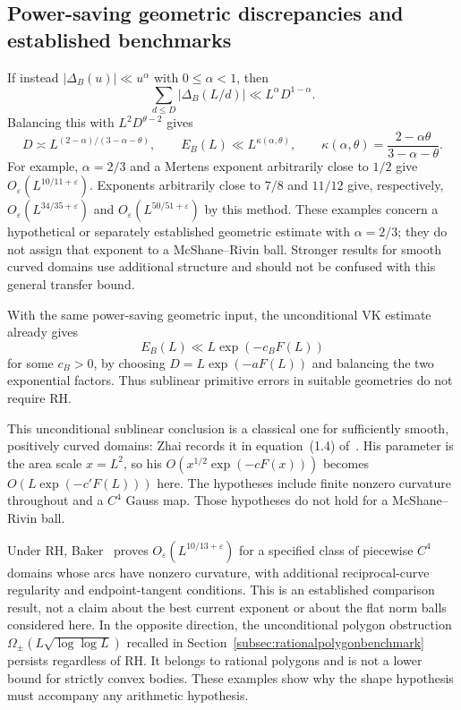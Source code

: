 \documentclass[11pt,a4paper]{article}
\numberwithin{equation}{section}
\theoremstyle{definition}
\theoremstyle{remark}
\begin{document}
\subsection{Power-saving geometric discrepancies and established benchmarks}
If instead $|\Delta_B(u)|\ll u^\alpha$ with $0\le\alpha<1$, then
\[
 \sum_{d\le D}|\Delta_B(L/d)|\ll L^\alpha D^{1-\alpha}.
\]
Balancing this with $L^2D^{\theta-2}$ gives
\begin{equation}\label{eq:primitiveRHbalancedpower}
 D\asymp L^{(2-\alpha)/(3-\alpha-\theta)},\qquad
 E_B(L)\ll L^{\kappa(\alpha,\theta)},\qquad
 \kappa(\alpha,\theta)=\frac{2-\alpha\theta}{3-\alpha-\theta}.
\end{equation}
For example, $\alpha=2/3$ and a Mertens exponent arbitrarily close
to $1/2$ give $O_\varepsilon(L^{10/11+\varepsilon})$.
Exponents arbitrarily close to $7/8$ and $11/12$ give, respectively,
$O_\varepsilon(L^{34/35+\varepsilon})$ and
$O_\varepsilon(L^{50/51+\varepsilon})$ by this method.
These examples concern a hypothetical or separately established
geometric estimate with $\alpha=2/3$; they do not assign that exponent
to a McShane--Rivin ball.  Stronger results for smooth curved domains
use additional structure and should not be confused with this general
transfer bound.

With the same power-saving geometric input, the unconditional VK
estimate already gives
\[
 E_B(L)\ll L\exp(-c_B F(L))
\]
for some $c_B>0$, by choosing
$D=L\exp(-aF(L))$ and balancing the two exponential factors.
Thus sublinear primitive errors in suitable geometries do not require RH.


This unconditional sublinear conclusion is a classical one for
sufficiently smooth, positively curved domains: Zhai records it in
equation~(1.4) of~\cite{ZhaiPrimitive2003}. His parameter is the area
scale $x=L^2$, so his $O(x^{1/2}\exp(-cF(x)))$ becomes
$O(L\exp(-c'F(L)))$ here. The hypotheses include finite nonzero
curvature throughout and a $C^4$ Gauss map. Those hypotheses do not
hold for a McShane--Rivin ball.

Under RH, Baker~\cite[Theorem~1]{BakerPrimitive2010} proves
$O_\varepsilon(L^{10/13+\varepsilon})$ for a specified class of
piecewise $C^4$ domains whose arcs have nonzero curvature, with
additional reciprocal-curve regularity and endpoint-tangent conditions.
This is an established comparison result, not a claim about the best
current exponent or about the flat norm balls considered here.
In the opposite direction, the unconditional polygon obstruction
$\Omega_\pm(L\sqrt{\log\log L})$ recalled in
Section~\ref{subsec:rationalpolygonbenchmark} persists regardless of RH.
It belongs to rational polygons and is not a lower bound for strictly
convex bodies. These examples show why the shape hypothesis must
accompany any arithmetic hypothesis.
\end{document}
